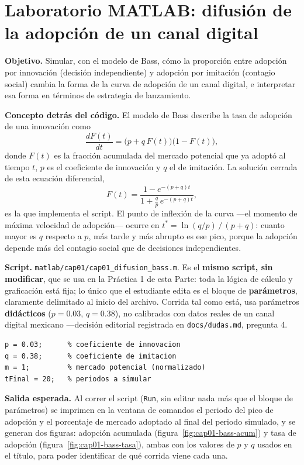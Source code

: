 \section{Laboratorio MATLAB: difusión de la adopción de un canal digital}

\begin{cajaLaboratorio}
\textbf{Objetivo.} Simular, con el modelo de Bass, cómo la proporción entre
adopción por innovación (decisión independiente) y adopción por imitación
(contagio social) cambia la forma de la curva de adopción de un canal
digital, e interpretar esa forma en términos de estrategia de lanzamiento.

\textbf{Concepto detrás del código.} El modelo de Bass \parencite{bass1969}
describe la tasa de adopción de una innovación como
\[
  \frac{dF(t)}{dt} = \big(p + q\,F(t)\big)\big(1 - F(t)\big),
\]
donde $F(t)$ es la fracción acumulada del mercado potencial que ya adoptó al
tiempo $t$, $p$ es el coeficiente de innovación y $q$ el de imitación. La
solución cerrada de esta ecuación diferencial,
\[
  F(t) = \frac{1 - e^{-(p+q)t}}{1 + \tfrac{q}{p}\,e^{-(p+q)t}},
\]
es la que implementa el script. El punto de inflexión de la curva —el
momento de máxima velocidad de adopción— ocurre en
$t^\ast = \ln(q/p)\,/\,(p+q)$: cuanto mayor es $q$ respecto a $p$, más tarde y
más abrupto es ese pico, porque la adopción depende más del contagio social
que de decisiones independientes.

\textbf{Script.} \texttt{matlab/cap01/cap01\_difusion\_bass.m}. Es el
\textbf{mismo script, sin modificar}, que se usa en la Práctica 1 de esta
Parte: toda la lógica de cálculo y graficación está fija; lo único que el
estudiante edita es el bloque de \textbf{parámetros}, claramente delimitado
al inicio del archivo. Corrida tal como está, usa parámetros
\textbf{didácticos} ($p=0.03$, $q=0.38$), no calibrados con datos reales de
un canal digital mexicano —decisión editorial registrada en
\texttt{docs/dudas.md}, pregunta 4.

\begin{lstlisting}[style=MATLABStyle, caption={Bloque de parámetros editable (\texttt{cap01\_difusion\_bass.m}) — es lo único que cambia entre corridas.}]
p = 0.03;      % coeficiente de innovacion
q = 0.38;      % coeficiente de imitacion
m = 1;         % mercado potencial (normalizado)
tFinal = 20;   % periodos a simular
\end{lstlisting}

\textbf{Salida esperada.} Al correr el script (\texttt{Run}, sin editar nada
más que el bloque de parámetros) se imprimen en la ventana de comandos el
periodo del pico de adopción y el porcentaje de mercado adoptado al final del
periodo simulado, y se generan dos figuras: adopción acumulada
(figura~\ref{fig:cap01-bass-acum}) y tasa de adopción
(figura~\ref{fig:cap01-bass-tasa}), ambas con los valores de $p$ y $q$
usados en el título, para poder identificar de qué corrida viene cada una.


\end{cajaLaboratorio}
